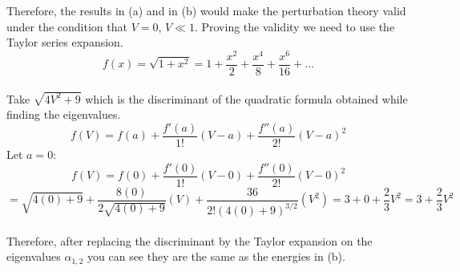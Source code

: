 \documentclass[11pt]{article}
\def\sp{\vspace{3mm}}
\theoremstyle{pink}
\theoremstyle{boxedsolution}
\theoremstyle{definition}
\theoremstyle{claim}
\begin{document}
Therefore, the results in (a) and in (b) would make the perturbation theory valid under the condition that $V=0$, $V\ll1$.
Proving the validity we need to use the Taylor series expansion. 
\sp
\[f(x)=\sqrt{1+x^2}=1+\frac{x^2}{2}+\frac{x^4}{8}+\frac{x^6}{16}+\dots\]
\sp
\\Take $\sqrt{4V^2+9}$ which is the discriminant of the quadratic formula obtained while finding the eigenvalues. 
\sp
\[f(V)=f(a)+\frac{f'(a)}{1!}(V-a)+\frac{f''(a)}{2!}(V-a)^2\]
\sp
Let $a=0$:
\sp
\[f(V)=f(0)+\frac{f'(0)}{1!}(V-0)+\frac{f''(0)}{2!}(V-0)^2\]
\sp
\[=\sqrt{4(0)+9}+\frac{8(0)}{2\sqrt{4(0)+9}}(V)+\frac{36}{2!(4(0)+9)^{3/2}}(V^2)=3+0+\frac{2}{3}V^2=3+\frac{2}{3}V^2\]
\sp
\\Therefore, after replacing the discriminant by the Taylor expansion on the eigenvalues $\alpha_{1,2}$ you can see they are the same as the energies in (b).


\newpage
\end{document}
